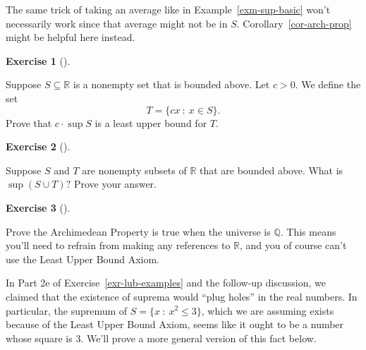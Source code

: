 \documentclass[
  letterpaper,
  DIV=11,
  numbers=noendperiod]{scrreprt}
\def\R{\mathbb R}
\def\Q{\mathbb Q}
\newcommand{\st}{~:~}
\theoremstyle{plain}
\theoremstyle{definition}
\newtheorem{exercise}{Exercise}[chapter]
\theoremstyle{plain}
\theoremstyle{plain}
\theoremstyle{definition}
\theoremstyle{definition}
\theoremstyle{remark}
\begin{document}
\begin{tcolorbox}[enhanced jigsaw, titlerule=0mm, opacitybacktitle=0.6, leftrule=.75mm, bottomrule=.15mm, left=2mm, arc=.35mm, colback=white, rightrule=.15mm, colframe=quarto-callout-tip-color-frame, toptitle=1mm, breakable, opacityback=0, colbacktitle=quarto-callout-tip-color!10!white, bottomtitle=1mm, title=\textcolor{quarto-callout-tip-color}{\faLightbulb}\hspace{0.5em}{Hint}, coltitle=black, toprule=.15mm]

The same trick of taking an average like in Example~\ref{exm-sup-basic}
won't necessarily work since that average might not be in \(S.\)
Corollary~\ref{cor-arch-prop} might be helpful here instead.

\end{tcolorbox}

\begin{exercise}[]\protect\hypertarget{exr-sup-of-scalar-multiple}{}\label{exr-sup-of-scalar-multiple}

Suppose \(S\subseteq\R\) is a nonempty set that is bounded above. Let
\(c>0\). We define the set \[T=\{cx\st x\in S\}.\] Prove that
\(c\cdot\sup S\) is a least upper bound for \(T\).

\end{exercise}

\begin{exercise}[]\protect\hypertarget{exr-sup-union}{}\label{exr-sup-union}

Suppose \(S\) and \(T\) are nonempty subsets of \(\R\) that are bounded
above. What is \(\sup(S\cup T)?\) Prove your answer.

\end{exercise}

\begin{exercise}[]\protect\hypertarget{exr-arch-prop-no-lub}{}\label{exr-arch-prop-no-lub}

Prove the Archimedean Property is true when the universe is \(\Q\). This
means you'll need to refrain from making any references to \(\R\), and
you of course can't use the Least Upper Bound Axiom.

\end{exercise}

In Part 2e of Exercise~\ref{exr-lub-examples} and the follow-up
discussion, we claimed that the existence of suprema would ``plug
holes'' in the real numbers. In particular, the supremum of
\(S=\{x\st x^2\leq 3\}\), which we are assuming exists because of the
Least Upper Bound Axiom, seems like it ought to be a number whose square
is 3. We'll prove a more general version of this fact below.
\end{document}
